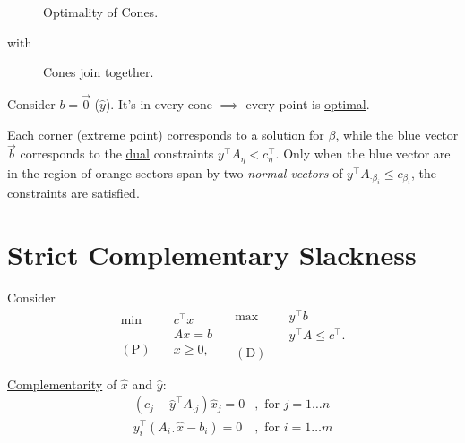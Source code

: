 \begin{figure}[H]
	\centering
	\caption[Caption for LOF]{Optimality of Cones.\protect\footnotemark}
	\label{fig:opt-cones}
\end{figure}
with
\begin{figure}[H]
	\centering
	\caption{Cones join together.}
	\label{fig:cones-join}
\end{figure}

\begin{note}
	Consider \(b = \vec{0}\) (\(\hat{y}\)). It's in every cone \(\implies\) every point is \hyperref[def:optimal-solution]{optimal}.
\end{note}

\begin{remark}
	Each corner (\hyperref[def:extreme-point]{extreme point}) corresponds to a \hyperref[def:solution]{solution} for \(\beta\), while the blue vector \(\vec{b}\) corresponds to the \hyperref[def:dual]{dual} constraints \(y^{\top} A_{\eta}<c_{\eta}^{\top}\). Only when the blue vector are in the region of orange sectors span by two \emph{normal vectors} of \(y^{\top}A_{\cdot \beta_i}\leq c_{\beta_i}\), the constraints are satisfied.
\end{remark}

\section{Strict Complementary Slackness}
Consider
\[
	\begin{aligned}
		\min~             & c^{\top}x \\
		                  & Ax = b    \\
		(\mathrm{P})\quad & x\geq  0,
	\end{aligned}\quad \begin{aligned}
		\max ~            & y^{\top}b               \\
		                  & y^{\top}A\leq c^{\top}. \\
		(\mathrm{D})\quad &
	\end{aligned}
\]

\begin{prev}
	\hyperref[def:complementary]{Complementarity} of \(\hat{x}\) and \(\hat{y}\)\(\colon\)
	\[
		\begin{split}
			(c_{j} - \hat{y}^{\top} A_{\cdot j}) \hat{x}_j = 0&, \text{ for }j = 1\dots n\\
			y^{\top}_i (A_{i\cdot}\hat{x} - b_{i}) = 0&, \text{ for } i = 1\dots m
		\end{split}
	\]
\end{prev}

